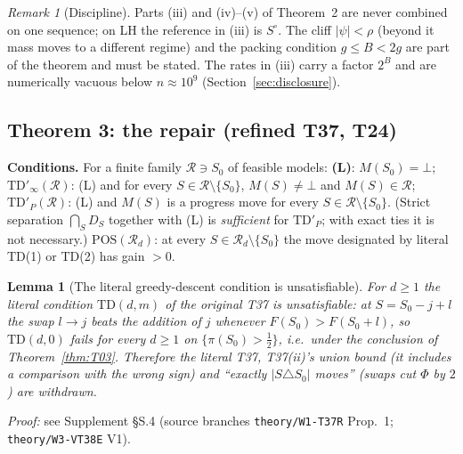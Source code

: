 \documentclass[11pt]{article}
\newtheorem{lemma}{Lemma}
\theoremstyle{definition}
\theoremstyle{remark}
\newtheorem{remark}{Remark}
\newcommand{\Sz}{S_0}
\newcommand{\cR}{\mathcal R}
\begin{document}
\begin{remark}[Discipline]\label{rem:regime}
Parts (iii) and (iv)--(v) of Theorem~2 are never combined on one sequence; on LH the reference in (iii) is $S^\circ$. The cliff
$|\psi|<\rho$ (beyond it mass moves to a different regime) and the packing condition $g\le B<2g$ are part of the theorem and must be
stated. The rates in (iii) carry a factor $2^B$ and are numerically vacuous below $n\approx10^9$ (Section~\ref{sec:disclosure}).
\end{remark}

\subsection{Theorem 3: the repair (refined T37, T24)}

\noindent\textbf{Conditions.} For a finite family $\cR\ni\Sz$ of feasible models: \textbf{(L)}: $M(\Sz)=\bot$;
$\mathrm{TD}'_\infty(\cR)$: (L) and for every $S\in\cR\setminus\{\Sz\}$, $M(S)\ne\bot$ and $M(S)\in\cR$;
$\mathrm{TD}'_P(\cR)$: (L) and $M(S)$ is a progress move for every $S\in\cR\setminus\{\Sz\}$.
(Strict separation $\bigcap_SD_S$ together with (L) is \emph{sufficient} for $\mathrm{TD}'_P$; with exact ties it is not necessary.)
$\mathrm{POS}(\cR_d)$: at every $S\in\cR_d\setminus\{\Sz\}$ the move designated by literal TD(1) or TD(2) has gain $>0$.

\begin{lemma}[The literal greedy-descent condition is unsatisfiable]\label{prop:literalTD}
For $d\ge1$ the literal condition $\mathrm{TD}(d,m)$ of the original T37 is unsatisfiable: at $S=\Sz-j+l$ the swap $l\to j$ beats
the addition of $j$ whenever $F(\Sz)>F(\Sz+l)$, so $\mathrm{TD}(d,0)$ fails for every $d\ge1$ on $\{\pi(\Sz)>\tfrac12\}$, i.e.\ under the conclusion of
Theorem~\ref{thm:T03}. Therefore the literal T37, T37(ii)'s union bound (it includes a comparison with the wrong sign) and
``exactly $|S\triangle\Sz|$ moves'' (swaps cut $\Phi$ by $2$) are withdrawn.
\end{lemma}
\noindent\emph{Proof:} see Supplement \S S.4 (source branches \texttt{theory/W1-T37R} Prop.~1; \texttt{theory/W3-VT38E} V1).
\end{document}
